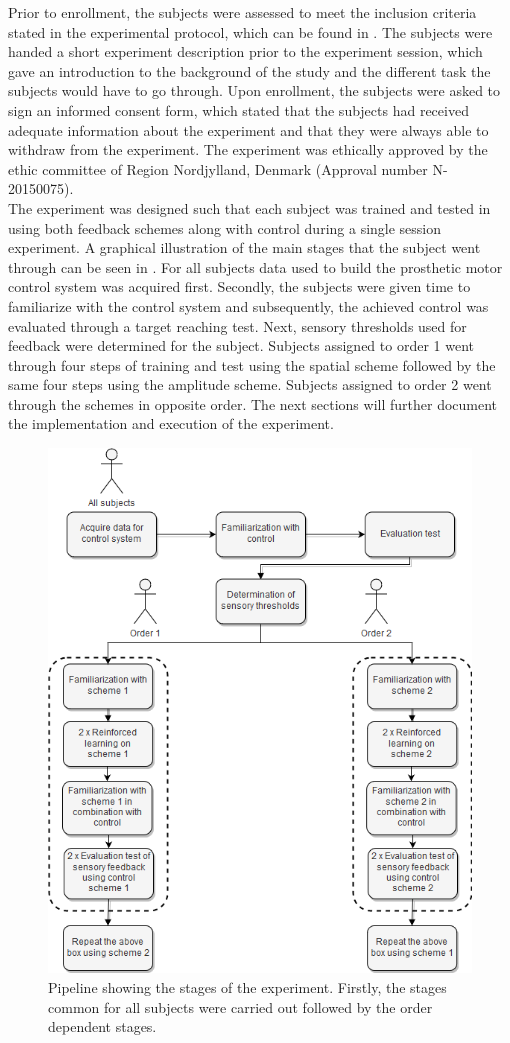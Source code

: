 \vspace{-0.4cm}
Prior to enrollment, the subjects were assessed to meet the inclusion criteria stated in the experimental protocol, which can be found in . The subjects were handed a short experiment description prior to the experiment session, which gave an introduction to the background of the study and the different task the subjects would have to go through. Upon enrollment, the subjects were asked to sign an informed consent form, which stated that the subjects had received adequate information about the experiment and that they were always able to withdraw from the experiment. The experiment was ethically approved by the ethic committee of Region Nordjylland, Denmark (Approval number N-20150075).\\
The experiment was designed such that each subject was trained and tested in using both feedback schemes along with control during a single session experiment. A graphical illustration of the main stages that the subject went through can be seen in . For all subjects data used to build the prosthetic motor control system was acquired first. Secondly, the subjects were given time to familiarize with the control system and subsequently, the achieved control was evaluated through a target reaching test. Next, sensory thresholds used for feedback were determined for the subject. Subjects assigned to order 1 went through four steps of training and test using the spatial scheme followed by the same four steps using the amplitude scheme. Subjects assigned to order 2 went through the schemes in opposite order. The next sections will further document the implementation and execution of the experiment.     

\begin{figure}[H]                 
	\includegraphics[width=.65\textwidth]{figures/std_design}
	\caption{Pipeline showing the stages of the experiment. Firstly, the stages common for all subjects were carried out followed by the order dependent stages.}
	\label{fig:std} 
\end{figure}